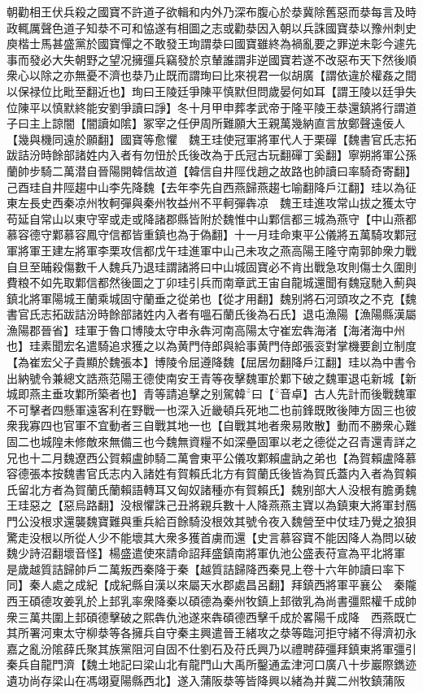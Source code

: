 朝勸相王伏兵殺之國寶不許道子欲輯和内外乃深布腹心於㳟冀除舊惡而㳟每言及時政輒厲聲色道子知㳟不可和恊遂有相圖之志或勸㳟因入朝以兵誅國寶㳟以豫州刺史庾楷士馬甚盛黨於國寶憚之不敢發王珣謂㳟曰國寶雖終為禍亂要之罪逆未彰今遽先事而發必大失朝野之望况擁彊兵竊發於京輦誰謂非逆國寶若遂不改惡布天下然後順衆心以除之亦無憂不濟也㳟乃止既而謂珣曰比來視君一似胡廣【謂依違於權姦之間以保禄位比毗至翻近也】珣曰王陵廷爭陳平慎默但問歲晏何如耳【謂王陵以廷爭失位陳平以慎默終能安劉爭讀曰諍】冬十月甲申葬孝武帝于隆平陵王㳟還鎮將行謂道子曰主上諒闇【闇讀如隂】冢宰之任伊周所難願大王親萬幾納直言放鄭聲遠佞人【幾與機同遠於願翻】國寶等愈懼　魏王珪使冠軍將軍代人于栗磾【魏書官氏志拓跋詰汾時餘部諸姓内入者有勿忸於氏後改為于氏冠古玩翻磾丁奚翻】寧朔將軍公孫蘭帥步騎二萬潜自晉陽開韓信故道【韓信自井陘伐趙之故路也帥讀曰率騎奇寄翻】己酉珪自井陘趨中山李先降魏【去年李先自西燕歸燕趨七喻翻降戶江翻】珪以為征東左長史西秦凉州牧軻彈與秦州牧益州不平軻彈犇凉　魏王珪進攻常山拔之獲太守苟延自常山以東守宰或走或降諸郡縣皆附於魏惟中山鄴信都三城為燕守【中山燕都慕容德守鄴慕容鳳守信都皆重鎮也為于偽翻】十一月珪命東平公儀將五萬騎攻鄴冠軍將軍王建左將軍李栗攻信都戊午珪進軍中山己未攻之燕高陽王隆守南郭帥衆力戰自旦至晡殺傷數千人魏兵乃退珪謂諸將曰中山城固寶必不肯出戰急攻則傷士久圍則費粮不如先取鄴信都然後圖之丁卯珪引兵而南章武王宙自龍城還聞有魏寇馳入薊與鎮北將軍陽城王蘭乘城固守蘭垂之從弟也【從才用翻】魏别將石河頭攻之不克【魏書官氏志拓跋詰汾時餘部諸姓内入者有嗢石蘭氏後為石氏】退屯漁陽【漁陽縣漢屬漁陽郡晉省】珪軍于魯口博陵太守申永犇河南高陽太守崔宏犇海渚【海渚海中州也】珪素聞宏名遣騎追求獲之以為黄門侍郎與給事黄門侍郎張衮對掌機要創立制度【為崔宏父子貴顯於魏張本】博陵令屈遵降魏【屈居勿翻降戶江翻】珪以為中書令出納號令兼總文誥燕范陽王德使南安王青等夜擊魏軍於鄴下破之魏軍退屯新城【新城即燕主垂攻鄴所築者也】青等請追擊之别駕韓曰【音卓】古人先計而後戰魏軍不可擊者四懸軍遠客利在野戰一也深入近畿頓兵死地二也前鋒既敗後陣方固三也彼衆我寡四也官軍不宜動者三自戰其地一也【自戰其地者衆易敗散】動而不勝衆心難固二也城隍未修敵來無備三也今魏無資糧不如深壘固軍以老之德從之召青還青詳之兄也十二月魏遼西公賀賴盧帥騎二萬會東平公儀攻鄴賴盧訥之弟也【為賀賴盧降慕容德張本按魏書官氏志内入諸姓有賀賴氏北方有賀蘭氏後皆為賀氏蓋内入者為賀賴氏留北方者為賀蘭氏蘭賴語轉耳又匈奴諸種亦有賀賴氏】魏别部大人没根有膽勇魏王珪惡之【惡烏路翻】没根懼誅己丑將親兵數十人降燕燕主寶以為鎮東大將軍封鴈門公没根求還襲魏寶難與重兵給百餘騎没根效其號令夜入魏營至中仗珪乃覺之狼狽驚走没根以所從人少不能壞其大衆多獲首虜而還【史言慕容寶不能因降人為問以破魏少詩沼翻壞音怪】楊盛遣使來請命詔拜盛鎮南將軍仇池公盛表苻宣為平北將軍　是歲越質詰歸帥戶二萬叛西秦降于秦【越質詰歸降西秦見上卷十六年帥讀曰率下同】秦人處之成紀【成紀縣自漢以來屬天水郡處昌呂翻】拜鎮西將軍平襄公　秦隴西王碩德攻姜乳於上邽乳率衆降秦以碩德為秦州牧鎮上邽徵乳為尚書彊熙權千成帥衆三萬共圍上邽碩德擊破之熙犇仇池遂來犇碩德西擊千成於畧陽千成降　西燕既亡其所署河東太守柳㳟等各擁兵自守秦主興遣晉王緒攻之㳟等臨河拒守緒不得濟初永嘉之亂汾隂薛氏聚其族黨阻河自固不仕劉石及苻氏興乃以禮聘薛彊拜鎮東將軍彊引秦兵自龍門濟【魏土地記曰梁山北有龍門山大禹所鑿通孟津河口廣八十步巖際鐫迹遺功尚存梁山在馮翊夏陽縣西北】遂入蒲阪㳟等皆降興以緒為并冀二州牧鎮蒲阪

